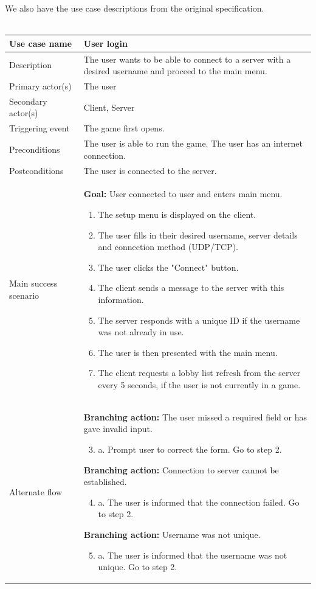 \documentclass[12pt]{article}
\newcommand{\return}{\\\\\noindent}
\begin{document}
\newpage
We also have the use case descriptions from the original specification.\return
\begin{tabularx}{\textwidth}{|l|X|} \hline
Use case name & \textbf{User login} \\ \hline
Description & The user wants to be able to connect to a server with a desired username and proceed to the main menu. \\ \hline
Primary actor(s) & The user \\ \hline
Secondary actor(s) & Client, Server \\ \hline
Triggering event & The game first opens. \\ \hline
Preconditions & The user is able to run the game. The user has an internet connection. \\ \hline
Postconditions & The user is connected to the server. \\ \hline
Main success scenario & 
\textbf{Goal:} User connected to user and enters main menu.
\begin{enumerate}[noitemsep,topsep=0px]
	\item The setup menu is displayed on the client.
	\item The user fills in their desired username, server details and connection method (UDP/TCP). 
	\item The user clicks the "Connect" button.
	\item The client sends a message to the server with this information.
	\item The server responds with a unique ID if the username was not already in use.
	\item The user is then presented with the main menu.
	\item The client requests a lobby list refresh from the server every 5 seconds, if the user is not currently in a game.
\end{enumerate} \\ \hline
Alternate flow & 
\textbf{Branching action:} The user missed a required field or has gave invalid input. \begin{enumerate}[noitemsep,topsep=0px,label={\arabic*}]
	\setcounter{enumi}{2} %
	\item a. Prompt user to correct the form. Go to step 2.
\end{enumerate}
\textbf{Branching action:} Connection to server cannot be established. 
\begin{enumerate}[noitemsep,topsep=0px,label={\arabic*}]
	\setcounter{enumi}{3} %
	\item a. The user is informed that the connection failed. Go to step 2.
\end{enumerate}
\textbf{Branching action:} Username was not unique. 
\begin{enumerate}[noitemsep,topsep=0px,label={\arabic*}]
	\setcounter{enumi}{4} %
	\item a. The user is informed that the username was not unique. Go to step 2.
\end{enumerate}
\\ \hline
\end{tabularx}
\end{document}
